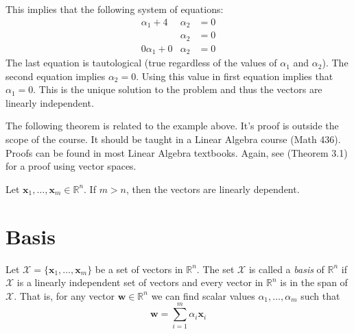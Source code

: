 \begin{example}
This implies that the following system of equations:
\begin{displaymath}
\begin{aligned}
\alpha_1 + 4&\alpha_2 & = 0\\
&\alpha_2 & =0\\
0\alpha_1 +0&\alpha_2 & =0
\end{aligned}
\end{displaymath}
The last equation is tautological (true regardless of the values of $\alpha_1$ and $\alpha_2$). The second equation implies $\alpha_2 = 0$. Using this value in first equation implies that $\alpha_1 = 0$. This is the unique solution to the problem and thus the vectors are linearly independent.
\end{example}

The following theorem is related to the example above. It's proof is outside the scope of the course. It should be taught in a Linear Algebra course (Math 436). Proofs can be found in most Linear Algebra textbooks. Again, see \cite{Str87} (Theorem 3.1) for a proof using vector spaces.
\begin{theorem} Let $\mathbf{x}_1,\dots,\mathbf{x}_m \in \mathbb{R}^n$. If $m > n$, then the vectors are linearly dependent. 
\end{theorem}

\section{Basis}

\begin{definition}[Basis] Let $\mathcal{X} = \{\mathbf{x}_1,\dots,\mathbf{x}_m\}$ be a set of vectors in $\mathbb{R}^n$. The set $\mathcal{X}$ is called a \textit{basis} of $\mathbb{R}^n$ if $\mathcal{X}$ is a linearly independent set of vectors and every vector in $\mathbb{R}^n$ is in the span of $\mathcal{X}$. That is, for any vector $\mathbf{w} \in \mathbb{R}^n$ we can find scalar values $\alpha_1,\dots,\alpha_m$ such that 
\begin{equation}
\mathbf{w} = \sum_{i=1}^{m}\alpha_i\mathbf{x}_i
\end{equation}
\end{definition}

